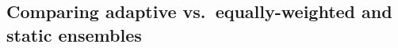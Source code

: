 \documentclass[sagev,times,Review,10pt]{sagej}
\def\adaptNon{\textbf{adaptive$_{\text{non}}$ }}
\begin{document}

\subsection{Comparing adaptive vs.~equally-weighted and static ensembles}

\end{document}
